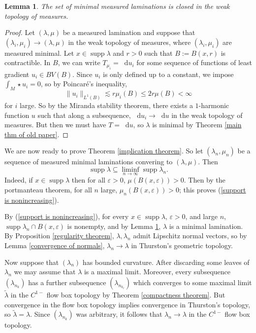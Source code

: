 \documentclass[reqno,11pt]{amsart}
\newcommand*\dif{\mathop{}\!\mathrm{d}}
\DeclareMathOperator{\supp}{supp}
\newtheorem{lemma}[theorem]{Lemma}
\theoremstyle{definition}
\numberwithin{equation}{section}
\begin{document}
\begin{lemma}\label{limits of measured geodesic lams are geodesic}
	The set of minimal measured laminations is closed in the weak topology of measures.
\end{lemma}
\begin{proof}
Let $(\lambda, \mu)$ be a measured lamination and suppose that $(\lambda_i, \mu_i) \to (\lambda, \mu)$ in the weak topology of measures, where $(\lambda_i, \mu_i)$ are measured minimal.
Let $x \in \supp \lambda$ and $r > 0$ such that $B := B(x, r)$ is contractible.
In $B$, we can write $T_{\mu_i} = \dif u_i$ for some sequence of functions of least gradient $u_i \in BV(B)$.
Since $u_i$ is only defined up to a constant, we impose $\int_M \star u_i = 0$, so by Poincar\'e's inequality,
$$\|u_i\|_{L^1(B)} \lesssim r\mu_i(B) \leq 2r \mu(B) < \infty$$
for $i$ large.
So by the Miranda stability theorem, there exists a $1$-harmonic function $u$ such that along a subsequence, $\dif u_i \to \dif u$ in the weak topology of measures.
But then we must have $T = \dif u$, so $\lambda$ is minimal by Theorem \ref{main thm of old paper}.
\end{proof}

We are now ready to prove Theorem \ref{implication theorem}.
So let $(\lambda_n, \mu_n)$ be a sequence of measured minimal laminations convering to $(\lambda, \mu)$.
Then
\begin{equation}\label{support is nonincreasing}
	\supp \lambda \subseteq \liminf_{n \to \infty} \supp \lambda_n.
\end{equation}
Indeed, if $x \in \supp \lambda$ then for all $\varepsilon > 0$, $\mu(B(x, \varepsilon)) > 0$.
Then by the portmanteau theorem, for all $n$ large, $\mu_n(B(x, \varepsilon)) > 0$; this proves (\ref{support is nonincreasing}).

By (\ref{support is nonincreasing}), for every $x \in \supp \lambda$, $\varepsilon > 0$, and large $n$, $\supp \lambda_n \cap B(x, \varepsilon)$ is nonempty, and by Lemma \ref{limits of measured geodesic lams are geodesic}, $\lambda$ is a minimal lamination.
By Proposition \ref{regularity theorem}, $\lambda, \lambda_n$ admit Lipschitz normal vectors, so by Lemma \ref{convergence of normals}, $\lambda_n \to \lambda$ in Thurston's geometric topology.

Now suppose that $(\lambda_n)$ has bounded curvature.
After discarding some leaves of $\lambda_n$ we may assume that $\lambda$ is a maximal limit.
Moreover, every subsequence $(\lambda_{n_k})$ has a further subsequence $(\lambda_{n_{k_\ell}})$ which converges to some maximal limit $\tilde \lambda$ in the $C^{1-}$ flow box topology by Theorem \ref{compactness theorem}.
But convergence in the flow box topology implies convergence in Thurston's topology, so $\tilde \lambda = \lambda$.
Since $(\lambda_{n_k})$ was arbitrary, it follows that $\lambda_n \to \lambda$ in the $C^{1-}$ flow box topology.
\end{document}
